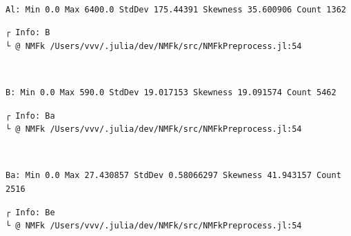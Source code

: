 \documentclass[11pt]{article}
\begin{document}
    \begin{center}
    \end{center}
    { \hspace*{\fill} \\}
    
    \begin{Verbatim}[commandchars=\\\{\}]
Al: Min 0.0 Max 6400.0 StdDev 175.44391 Skewness 35.600906 Count 1362
    \end{Verbatim}

    \begin{Verbatim}[commandchars=\\\{\}]
┌ Info: B
└ @ NMFk /Users/vvv/.julia/dev/NMFk/src/NMFkPreprocess.jl:54
    \end{Verbatim}

    \begin{center}
    \end{center}
    { \hspace*{\fill} \\}
    
    \begin{Verbatim}[commandchars=\\\{\}]
B: Min 0.0 Max 590.0 StdDev 19.017153 Skewness 19.091574 Count 5462
    \end{Verbatim}

    \begin{Verbatim}[commandchars=\\\{\}]
┌ Info: Ba
└ @ NMFk /Users/vvv/.julia/dev/NMFk/src/NMFkPreprocess.jl:54
    \end{Verbatim}

    \begin{center}
    \end{center}
    { \hspace*{\fill} \\}
    
    \begin{Verbatim}[commandchars=\\\{\}]
Ba: Min 0.0 Max 27.430857 StdDev 0.58066297 Skewness 41.943157 Count 2516
    \end{Verbatim}

    \begin{Verbatim}[commandchars=\\\{\}]
┌ Info: Be
└ @ NMFk /Users/vvv/.julia/dev/NMFk/src/NMFkPreprocess.jl:54
    \end{Verbatim}
\end{document}
